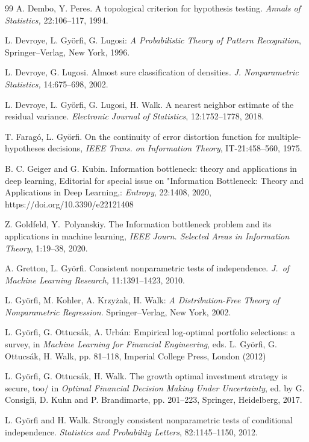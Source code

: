 \documentclass[11pt]{article}
\begin{document}
\begin{thebibliography}{99}
A. Dembo, Y.  Peres. 
A topological criterion for hypothesis testing.
{\it  Annals of Statistics,} 22:106--117,  1994.


 L.  Devroye, L.  Gy\"orfi, G.  Lugosi:
{\it A Probabilistic Theory of Pattern Recognition},
Springer--Verlag, New York, 1996.


L. Devroye, G. Lugosi. 
Almost sure classification of densities.
{\it J. Nonparametric Statistics,} 14:675--698, 2002.

L. Devroye, L. Gy\"orfi, G. Lugosi, H. Walk.
A nearest neighbor estimate of the residual variance.
{\em Electronic Journal of Statistics}, 12:1752--1778, 2018. 

T. Farag\'o, L. Gy\"orfi. 
On  the  continuity  of  error distortion function for multiple-hypotheses  decisions, 
{\em IEEE Trans. on Information Theory}, IT-21:458--560, 1975.

 B. C. Geiger and G. Kubin. 
Information bottleneck: theory and applications in deep learning, Editorial for special issue on "Information Bottleneck: Theory and Applications in Deep Learning,: {\it Entropy}, 22:1408, 2020, https://doi.org/10.3390/e22121408 

 Z. Goldfeld,  Y.~Polyanskiy. The Information bottleneck problem and its applications in machine learning, \emph{IEEE Journ. Selected Areas in Information Theory}, 1:19--38, 2020. 


A. Gretton, L. Gy{\"o}rfi. 
Consistent nonparametric tests of independence.
{\it J.\ of Machine Learning Research,} 11:1391--1423, 2010.

L. Gy\"orfi, M. Kohler, A.  Krzy\.zak, H. Walk: 
{\it A Distribution-Free Theory of Nonparametric Regression}.
Springer--Verlag, New York, 2002.

L. Gy\"orfi, G. Ottucs\'ak, A.  Urb\'an: 
Empirical log-optimal portfolio selections: a survey,
\newblock in {\em Machine Learning for Financial Engineering}, eds. L. Gy\"orfi, G. Ottucs\'ak, H. Walk,
pp. 81--118, Imperial College Press, London (2012)

L. Gy\"orfi, G. Ottucs\'ak, H. Walk. 
The growth optimal investment strategy is secure, too/
in {\em Optimal Financial Decision Making Under Uncertainty},
ed. by G. Consigli, D. Kuhn and P. Brandimarte, pp. 201--223,
Springer, Heidelberg, 2017.

L. Gy\"orfi and H. Walk.
Strongly consistent nonparametric tests of conditional independence.
{\em Statistics and Probability Letters}, 82:1145--1150, 2012.


\end{thebibliography}
\end{document}
